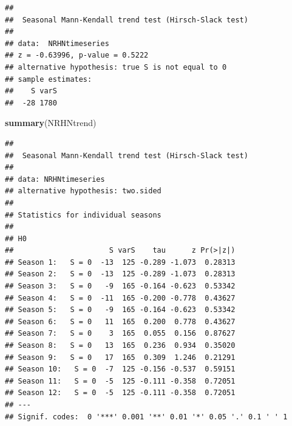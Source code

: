 \documentclass[12pt,]{article}
\newenvironment{Shaded}{\begin{snugshade}}{\end{snugshade}}
\newcommand{\CommentTok}[1]{\textcolor[rgb]{0.56,0.35,0.01}{\textit{#1}}}
\newcommand{\DataTypeTok}[1]{\textcolor[rgb]{0.13,0.29,0.53}{#1}}
\newcommand{\DecValTok}[1]{\textcolor[rgb]{0.00,0.00,0.81}{#1}}
\newcommand{\KeywordTok}[1]{\textcolor[rgb]{0.13,0.29,0.53}{\textbf{#1}}}
\newcommand{\NormalTok}[1]{#1}
\newcommand{\OperatorTok}[1]{\textcolor[rgb]{0.81,0.36,0.00}{\textbf{#1}}}
\newcommand{\StringTok}[1]{\textcolor[rgb]{0.31,0.60,0.02}{#1}}
\begin{document}
\begin{Shaded}
\end{Shaded}

\begin{verbatim}
## 
##  Seasonal Mann-Kendall trend test (Hirsch-Slack test)
## 
## data:  NRHNtimeseries
## z = -0.63996, p-value = 0.5222
## alternative hypothesis: true S is not equal to 0
## sample estimates:
##    S varS 
##  -28 1780
\end{verbatim}

\begin{Shaded}
\begin{Highlighting}[]
\KeywordTok{summary}\NormalTok{(NRHNtrend)}
\end{Highlighting}
\end{Shaded}

\begin{verbatim}
## 
##  Seasonal Mann-Kendall trend test (Hirsch-Slack test)
## 
## data: NRHNtimeseries
## alternative hypothesis: two.sided
## 
## Statistics for individual seasons
## 
## H0
##                      S varS    tau      z Pr(>|z|)  
## Season 1:   S = 0  -13  125 -0.289 -1.073  0.28313  
## Season 2:   S = 0  -13  125 -0.289 -1.073  0.28313  
## Season 3:   S = 0   -9  165 -0.164 -0.623  0.53342  
## Season 4:   S = 0  -11  165 -0.200 -0.778  0.43627  
## Season 5:   S = 0   -9  165 -0.164 -0.623  0.53342  
## Season 6:   S = 0   11  165  0.200  0.778  0.43627  
## Season 7:   S = 0    3  165  0.055  0.156  0.87627  
## Season 8:   S = 0   13  165  0.236  0.934  0.35020  
## Season 9:   S = 0   17  165  0.309  1.246  0.21291  
## Season 10:   S = 0  -7  125 -0.156 -0.537  0.59151  
## Season 11:   S = 0  -5  125 -0.111 -0.358  0.72051  
## Season 12:   S = 0  -5  125 -0.111 -0.358  0.72051  
## ---
## Signif. codes:  0 '***' 0.001 '**' 0.01 '*' 0.05 '.' 0.1 ' ' 1
\end{verbatim}
\end{document}
